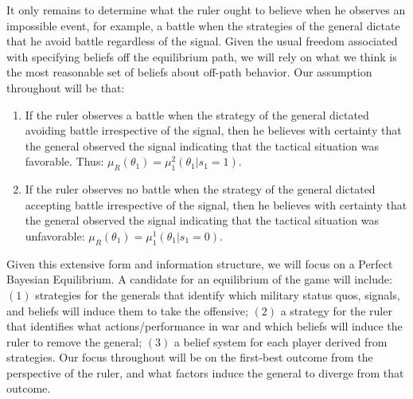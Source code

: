 \documentclass[11pt,]{article}
\begin{document}
It only remains to determine what the ruler ought to believe when he observes an impossible event, for example, a battle when the strategies of the general dictate that he avoid battle regardless of the signal.  Given the usual freedom associated with specifying beliefs off the equilibrium path, we will rely on what we think is the most reasonable set of beliefs about off-path behavior.  Our assumption throughout will be that:
\begin{enumerate}
\item If the ruler observes a battle when the strategy of the general dictated avoiding battle irrespective of the signal, then he believes with certainty that the general observed the signal indicating that the tactical situation was favorable.  Thus: $\mu_R(\theta_{1})=\mu_{1}^2(\theta_{1}|s_1=1)$.
\item If the ruler observes no battle when the strategy of the general dictated accepting battle irrespective of the signal, then he believes with certainty that the general observed the signal indicating that the tactical situation was unfavorable: $\mu_R(\theta_{1})=\mu_{1}^1(\theta_{1}|s_1=0)$.
\end{enumerate}  



\noindent Given this extensive form and information structure, we will focus on a Perfect Bayesian Equilibrium.  A candidate for an equilibrium of the game will include: $(1)$ strategies for the generals that identify which military status quos, signals, and beliefs will induce them to take the offensive; $(2)$ a strategy for the ruler that identifies what actions/performance in war and which beliefs will induce the ruler to remove the general; $(3)$ a belief system for each player derived from strategies.  Our focus throughout will be on the first-best outcome from the perspective of the ruler, and what factors induce the general to diverge from that outcome.
\end{document}
